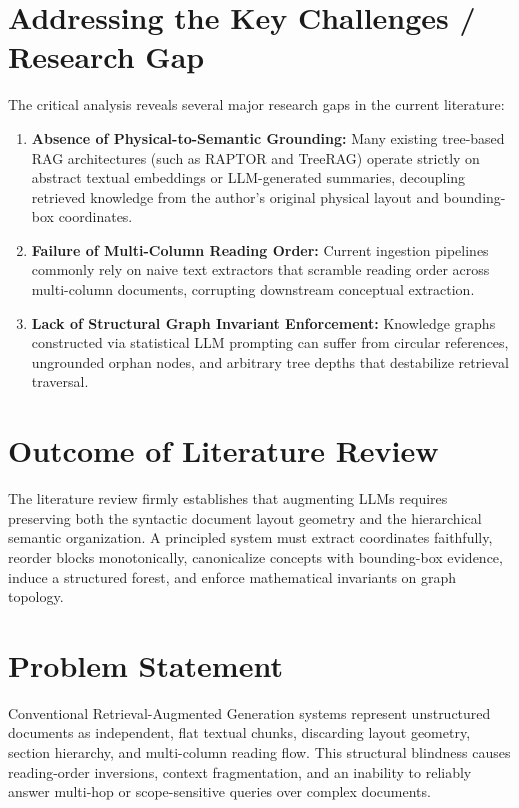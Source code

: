 \documentclass[12pt,a4paper]{report}
\begin{document}
\section{Addressing the Key Challenges / Research Gap}
The critical analysis reveals several major research gaps in the current literature:
\begin{enumerate}
    \item \textbf{Absence of Physical-to-Semantic Grounding:} Many existing tree-based RAG architectures (such as RAPTOR and TreeRAG) operate strictly on abstract textual embeddings or LLM-generated summaries, decoupling retrieved knowledge from the author's original physical layout and bounding-box coordinates.
    \item \textbf{Failure of Multi-Column Reading Order:} Current ingestion pipelines commonly rely on naive text extractors that scramble reading order across multi-column documents, corrupting downstream conceptual extraction.
    \item \textbf{Lack of Structural Graph Invariant Enforcement:} Knowledge graphs constructed via statistical LLM prompting can suffer from circular references, ungrounded orphan nodes, and arbitrary tree depths that destabilize retrieval traversal.
\end{enumerate}

\section{Outcome of Literature Review}
The literature review firmly establishes that augmenting LLMs requires preserving both the syntactic document layout geometry and the hierarchical semantic organization. A principled system must extract coordinates faithfully, reorder blocks monotonically, canonicalize concepts with bounding-box evidence, induce a structured forest, and enforce mathematical invariants on graph topology.

\section{Problem Statement}
Conventional Retrieval-Augmented Generation systems represent unstructured documents as independent, flat textual chunks, discarding layout geometry, section hierarchy, and multi-column reading flow. This structural blindness causes reading-order inversions, context fragmentation, and an inability to reliably answer multi-hop or scope-sensitive queries over complex documents. 
\end{document}
